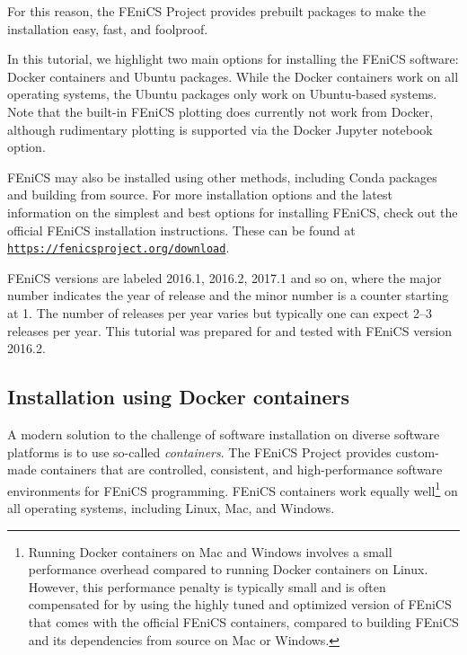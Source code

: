 \documentclass[graybox,envcountchap,sectrefs,final]{svmonodo}
\newenvironment{notice_mdfboxadmon}[1][]{
\begin{notice_mdfboxmdframed}[frametitle=#1]
}
{
\end{notice_mdfboxmdframed}
}
\begin{document}

For this reason, the FEniCS Project provides prebuilt packages to make
the installation easy, fast, and foolproof.

\begin{notice_mdfboxadmon}
In this tutorial, we highlight two main options for installing the
FEniCS software: Docker containers and Ubuntu packages. While the
Docker containers work on all operating systems, the Ubuntu packages
only work on Ubuntu-based systems. Note that the built-in FEniCS
plotting does currently not work from Docker, although rudimentary
plotting is supported via the Docker Jupyter notebook option.

FEniCS may also be installed using other methods, including Conda
packages and building from source. For more installation options and
the latest information on the simplest and best options for installing
FEniCS, check out the official FEniCS installation instructions. These
can be found at
\href{{https://fenicsproject.org/download}}{\nolinkurl{https://fenicsproject.org/download}}.
\end{notice_mdfboxadmon} %

\begin{notice_mdfboxadmon}
FEniCS versions are labeled 2016.1, 2016.2, 2017.1 and so on,
where the major number indicates the year of release and the
minor number is a counter starting at 1. The number of releases
per year varies but typically one can expect 2--3 releases per
year. This tutorial was prepared for and tested with FEniCS
version 2016.2.
\end{notice_mdfboxadmon} %


\subsection{Installation using Docker containers}


A modern solution to the challenge of software installation on diverse
software platforms is to use so-called \emph{containers}. The FEniCS
Project provides custom-made containers that are controlled,
consistent, and high-performance software environments for FEniCS
programming. FEniCS containers work equally well\footnote{Running Docker containers on Mac and Windows involves a small performance overhead compared to running Docker containers on Linux. However, this performance penalty is typically small and is often compensated for by using the highly tuned and optimized version of FEniCS that comes with the official FEniCS containers, compared to building FEniCS and its dependencies from source on Mac or Windows.}
on all operating systems, including Linux, Mac, and Windows.
\end{document}
